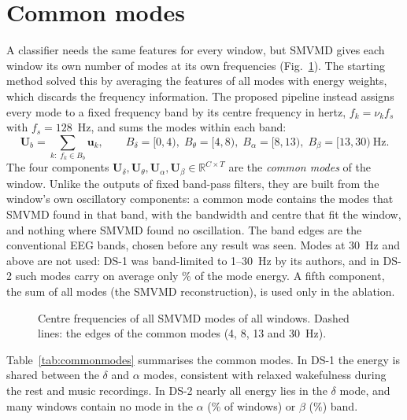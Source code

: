 \section{Common modes}
A classifier needs the same features for every window, but SMVMD gives each window its own
number of modes at its own frequencies (Fig.~\ref{fig:centrefreq}). The starting method solved
this by averaging the features of all modes with energy weights, which discards the frequency
information. The proposed pipeline instead assigns every mode to a fixed frequency band by its
centre frequency in hertz, $f_k=\nu_k f_s$ with $f_s=128$~Hz, and sums the modes within each
band:
\begin{equation}
\mathbf{U}_b = \sum_{k:\; f_k\in B_b} \mathbf{u}_k,\qquad
B_\delta=[0,4),\; B_\theta=[4,8),\; B_\alpha=[8,13),\; B_\beta=[13,30)\ \text{Hz}.
\label{eq:common}
\end{equation}
The four components $\mathbf{U}_\delta,\mathbf{U}_\theta,\mathbf{U}_\alpha,\mathbf{U}_\beta \in
\mathbb{R}^{C\times T}$ are the \emph{common modes} of the window. Unlike the outputs of fixed
band-pass filters, they are built from the window's own oscillatory components: a common mode
contains the modes that SMVMD found in that band, with the bandwidth and centre that fit the
window, and nothing where SMVMD found no oscillation. The band edges are the conventional EEG
bands, chosen before any result was seen. Modes at 30~Hz and above are not used: DS-1 was
band-limited to 1--30~Hz by its authors, and in DS-2 such modes carry on average only
\% of the mode energy. A fifth component, the sum of all modes (the SMVMD
reconstruction), is used only in the ablation.

\begin{figure}[H]\centering
{}
\caption{Centre frequencies of all SMVMD modes of all windows. Dashed lines: the edges of the
common modes (4, 8, 13 and 30~Hz).}
\label{fig:centrefreq}
\end{figure}

Table~\ref{tab:commonmodes} summarises the common modes. In DS-1 the energy is shared between the
$\delta$ and $\alpha$ modes, consistent with relaxed wakefulness during the rest and music
recordings. In DS-2 nearly all energy lies in the $\delta$ mode, and many windows contain no mode
in the $\alpha$ (\% of windows) or $\beta$ (\%) band.

\begin{table}[H]
\caption{Common modes: modes per window (mean and range), and per band the mean share of mode
energy (\%) / the percentage of windows without any mode in that band.}
\label{tab:commonmodes}\centering
{}
\end{table}

